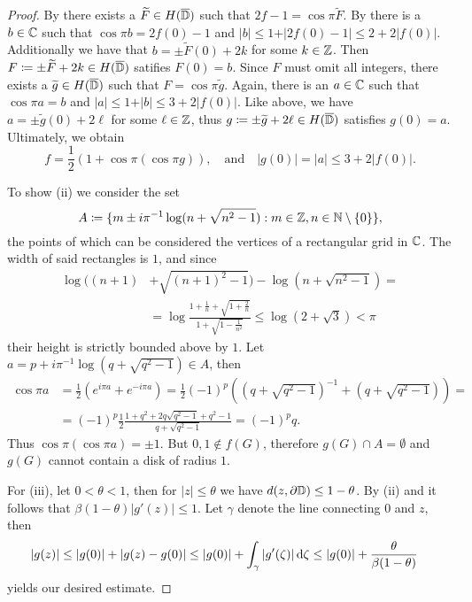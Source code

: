 \begin{proof}
    By  there exists a $\widetilde{F} \in H(\overline{\mathbb{D}})$ such that $2f - 1 = \cos \pi \widetilde{F}$. By  there is a $b \in \mathbb{C}$ such that $\cos \pi b = 2f(0) - 1$ and $\vert b \vert \leq 1 + \vert 2 f(0) - 1 \vert \leq 2 + 2 \vert f(0) \vert$. Additionally we have that $b = \pm \widetilde{F}(0) + 2k$ for some $k \in \mathbb{Z}$. Then $F \coloneqq \pm \widetilde{F} + 2k \in H(\overline{\mathbb{D}})$ satifies $F(0) = b$. Since $F$ must omit all integers, there exists a $\widetilde{g} \in H(\overline{\mathbb{D}})$ such that $F = \cos \pi \widetilde{g}$. Again, there is an $a \in \mathbb{C}$ such that $\cos \pi a = b$ and $\vert a \vert \leq 1 + \vert b \vert \leq 3 + 2 \vert f(0) \vert$. Like above, we have $a = \pm \widetilde{g}(0) + 2\ell$ for some $\ell \in \mathbb{Z}$, thus $g \coloneqq \pm \widetilde{g} + 2\ell \in H(\overline{\mathbb{D}})$ satisfies $g(0) = a$. Ultimately, we obtain
    $$ \textstyle f = \frac{1}{2} (1 + \cos \pi (\cos \pi g)), \quad \textrm{and} \quad \vert g(0) \vert = \vert a \vert \leq 3 + 2 \vert f(0) \vert. $$

    To show (ii) we consider the set
    $$ A \coloneqq \{ m \pm i \pi^{-1} \log (n + \sqrt{n^2 - 1}) : m \in \mathbb{Z}, n \in \mathbb{N} \setminus \{ 0 \} \}, $$
    the points of which can be considered the vertices of a rectangular grid in $\mathbb{C}$. The width of said rectangles is $1$, and since
    \begin{align*}
        \log ((n+1) &+ \sqrt{(n+1)^2 - 1}) - \log (n + \sqrt{n^2 - 1}) = \\
        &= \log \frac{1 + \frac{1}{n} + \sqrt{1 + \frac{2}{n}}}{1 + \sqrt{1 - \frac{1}{n^2}}} \leq \log (2 + \sqrt{3}) < \pi
    \end{align*}
    their height is strictly bounded above by $1$. Let $a = p + i \pi^{-1} \log(q + \sqrt{q^2 - 1}) \in A$, then
    \begin{align*}
        \cos \pi a &= {\textstyle\frac{1}{2}}( e^{i \pi a} + e^{-i \pi a}) = {\textstyle\frac{1}{2}} (-1)^p ((q + \sqrt{q^2 - 1})^{-1} + (q + \sqrt{q^2 - 1})) = \\
        &= (-1)^p \frac{1}{2} \frac{1 + q^2 + 2q \sqrt{q^2 - 1} + q^2 - 1}{q + \sqrt{q^2 - 1}} = (-1)^p q.
    \end{align*}
    Thus $\cos \pi (\cos \pi a) = \pm 1$. But $0, 1 \notin f(G)$, therefore $g(G) \cap A = \emptyset$ and $g(G)$ cannot contain a disk of radius $1$.

    For (iii), let $0 < \theta < 1$, then for $\vert z \vert \leq \theta$ we have $d(z, \partial \mathbb{D}) \leq 1 - \theta$. By (ii) and  it follows that $\beta (1 - \theta) \vert g'(z) \vert \leq 1$. Let $\gamma$ denote the line connecting $0$ and $z$, then
    \begin{align*}
        \vert g(z) \vert &\leq \vert g(0) \vert + \vert g(z) - g(0) \vert \leq \vert g(0) \vert + \int_\gamma \vert g'(\zeta) \vert \mathop{}\!\mathrm{d} \zeta \leq \vert g(0) \vert + \frac{\theta}{\beta (1 - \theta)}
    \end{align*}
    yields our desired estimate.
\end{proof}

